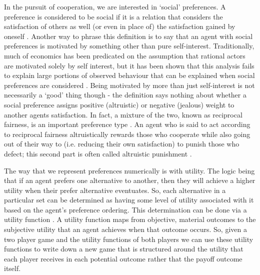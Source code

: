 \documentclass[11pt]{article}
\newcommand*{\np}{\par\noindent\newline}
\begin{document}
\np In the pursuit of cooperation, we are interested in `social' preferences. A preference is considered to be social if
it is a relation that considers the satisfaction of others as well (or even in place of) the satisfaction gained by
oneself \cite{angner_course_2012}. Another way to phrase this definition is to say that an agent with social preferences
is motivated by something other than pure self-interest. Traditionally, much of economics has been predicated on the
assumption that rational actors are motivated solely by self interest, but it has been shown that this analysis fails to
explain large portions of observed behaviour that can be explained when social preferences are considered
\cite{fehr_why_2002}. Being motivated by more than just self-interest is not necessarily a `good' thing though - the
definition says nothing about whether a social preference assigns positive (altruistic) or negative (jealous) weight to
another agents satisfaction. In fact, a mixture of the two, known as reciprocal fairness, is an important preference
type \cite{fehr_why_2002,guth_evolutionary_1995}. An agent who is said to act according to reciprocal fairness
altruistically rewards those who cooperate while also going out of their way to (i.e. reducing their own satisfaction)
to punish those who defect; this second part is often called altruistic punishment \cite{fehr_altruistic_2002}.

\np The way that we represent preferences numerically is with utility. The logic being that if an agent prefers one
alternative to another, then they will achieve a higher utility when their prefer alternative eventuates. So, each
alternative in a particular set can be determined as having some level of utility associated with it based on the
agent's preference ordering. This determination can be done via a utility function \cite{angner_course_2012}. A utility
function maps from objective, material outcomes to the subjective utility that an agent achieves when that outcome
occurs. So, given a two player game and the utility functions of both players we can use these utility functions
to write down a new game that is structured around the utility that each player receives in each potential outcome
rather that the payoff outcome itself.
\end{document}
